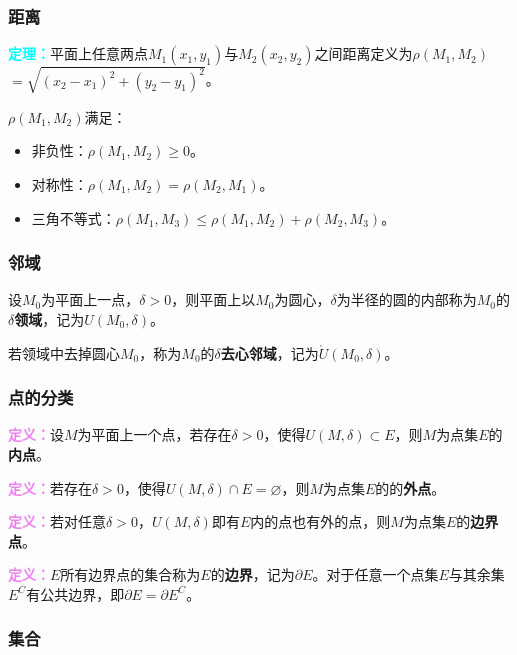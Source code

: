 \documentclass[UTF8, 12pt]{ctexart}
\begin{document}
        \subsubsection{距离}

        \textcolor{aqua}{\textbf{定理：}}平面上任意两点$M_1(x_1,y_1)$与$M_2(x_2,y_2)$之间距离定义为$\rho(M_1,M_2)$\\$=\sqrt{(x_2-x_1)^2+(y_2-y_1)^2}$。

        $\rho(M_1,M_2)$满足：

        \begin{itemize}
            \item 非负性：$\rho(M_1,M_2)\geqslant0$。
            \item 对称性：$\rho(M_1,M_2)=\rho(M_2,M_1)$。
            \item 三角不等式：$\rho(M_1,M_3)\leqslant\rho(M_1,M_2)+\rho(M_2,M_3)$。
        \end{itemize}

        \subsubsection{邻域}

        设$M_0$为平面上一点，$\delta>0$，则平面上以$M_0$为圆心，$\delta$为半径的圆的内部称为$M_0$的\textbf{$\delta$领域}，记为$U(M_0,\delta)$。

        若领域中去掉圆心$M_0$，称为$M_0$的\textbf{$\delta$去心邻域}，记为$\mathring{U}(M_0,\delta)$。

        \subsubsection{点的分类}

        \textcolor{violet}{\textbf{定义：}}设$M$为平面上一个点，若存在$\delta>0$，使得$U(M,\delta)\subset E$，则$M$为点集$E$的\textbf{内点}。

        \textcolor{violet}{\textbf{定义：}}若存在$\delta>0$，使得$U(M,\delta)\cap E=\varnothing$，则$M$为点集$E$的的\textbf{外点}。

        \textcolor{violet}{\textbf{定义：}}若对任意$\delta>0$，$U(M,\delta)$即有$E$内的点也有外的点，则$M$为点集$E$的\textbf{边界点}。

        \textcolor{violet}{\textbf{定义：}}$E$所有边界点的集合称为$E$的\textbf{边界}，记为$\partial E$。对于任意一个点集$E$与其余集$E^C$有公共边界，即$\partial E=\partial E^C$。

        \subsubsection{集合}
\end{document}
